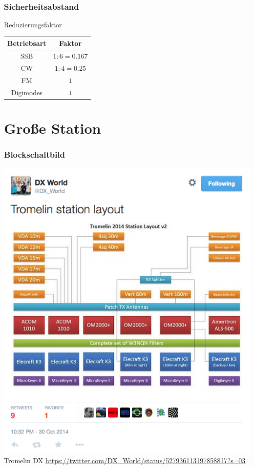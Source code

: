 \begin{frame}
    \frametitle{Sicherheitsabstand}
    \begin{center}
	\begin{block}{Reduzierungsfaktor}   
    \begin{center}
	\begin{tabular}{c|c}
  		Betriebsart & Faktor \\ \hline \hline
  		SSB & $1:6 = 0.167$ \\ \hline
  		CW & $1:4 = 0.25$ \\ \hline
  		FM & $1$ \\ \hline
  		Digimodes & $1$ 
 	\end{tabular} \end{center}
	\end{block}
    \end{center}
\end{frame}

\section*{Große Station}

\begin{frame}
    \frametitle{Blockschaltbild}
    \begin{center}
		\includegraphics[height=0.9\textheight]{a19/BsB.png}\\
        \tiny Tromelin DX \url{https://twitter.com/DX_World/status/527936113197858817?s=03}
    \end{center}
\end{frame}

